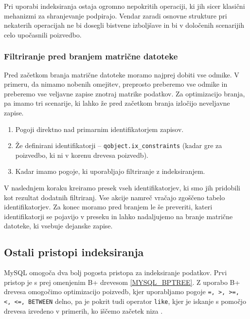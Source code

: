 \documentclass[a4paper,12pt,openright]{book}
\begin{document}
        \noindent
        Pri uporabi indeksiranja ostaja ogromno nepokritih operaciji, ki jih sicer klasični mehanizmi za shranjevanje podpirajo. Vendar zaradi osnovne strukture pri nekaterih operacijah ne bi dosegli bistvene izboljšave in bi v določenih scenarijih celo upočasnili poizvedbo.

        \subsubsection{Filtriranje pred branjem matrične datoteke}

        Pred začetkom branja matrične datoteke moramo najprej dobiti vse odmike. V primeru, da nimamo nobenih omejitev, preprosto preberemo vse odmike in preberemo vse veljavne zapise znotraj matrike podatkov. Za optimizacijo branja, pa imamo tri scenarije, ki lahko že pred začetkom branja izločijo neveljavne zapise.

        \begin{enumerate}
            \item Pogoji direktno nad primarnim identifikatorjem zapisov.
            \item Že definirani identifikatorji – {\tt qobject.ix\_constraints} (kadar gre za poizvedbo, ki ni v korenu drevesa poizvedb).
            \item Kadar imamo pogoje, ki uporabljajo filtriranje z indeksiranjem.
        \end{enumerate}

        \noindent
        V naslednjem koraku kreiramo presek vseh identifikatorjev, ki smo jih pridobili kot rezultat dodatnih filtriranj. Vse akcije namreč vračajo zgoščeno tabelo identifikatorjev. Za konec moramo pred branjem le še preveriti, kateri identifikatorji se pojavijo v preseku in lahko nadaljujemo na branje matrične datoteke, ki vsebuje dejanske zapise.

        \subsection{Ostali pristopi indeksiranja}

        MySQL omogoča dva bolj pogosta pristopa za indeksiranje podatkov. Prvi pristop je s prej omenjenim B+ drevesom \ref{MYSQL_BPTREE}. Z uporabo B+ drevesa omogočimo optimizacijo poizvedb, kjer uporabljamo pogoje {\tt =, >, >=, <, <=, BETWEEN} delno, pa je pokrit tudi operator {\tt like}, kjer je iskanje s pomočjo drevesa izvedeno v primerih, ko iščemo začetek niza \cite{TREE_HASH_MYSQL}.
\end{document}
